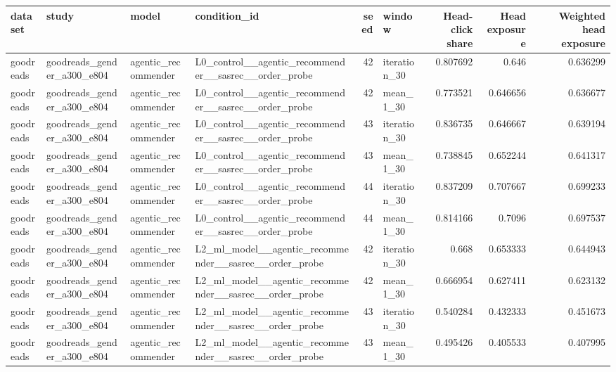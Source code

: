 \begin{table}[htbp!]
\centering
\small
\setlength{\tabcolsep}{3pt}
\renewcommand{\arraystretch}{1.1}
\begin{tabular}{llllrlrrr}
\hline
dataset & study & model & condition\_id & seed & window & Head-click share & Head exposure & Weighted head exposure \\
\hline
goodreads & goodreads\_gender\_a300\_e804 & agentic\_recommender & L0\_control\_\_agentic\_recommender\_\_sasrec\_\_order\_probe & 42 & iteration\_30 & 0.807692 & 0.646 & 0.636299 \\
goodreads & goodreads\_gender\_a300\_e804 & agentic\_recommender & L0\_control\_\_agentic\_recommender\_\_sasrec\_\_order\_probe & 42 & mean\_1\_30 & 0.773521 & 0.646656 & 0.636677 \\
goodreads & goodreads\_gender\_a300\_e804 & agentic\_recommender & L0\_control\_\_agentic\_recommender\_\_sasrec\_\_order\_probe & 43 & iteration\_30 & 0.836735 & 0.646667 & 0.639194 \\
goodreads & goodreads\_gender\_a300\_e804 & agentic\_recommender & L0\_control\_\_agentic\_recommender\_\_sasrec\_\_order\_probe & 43 & mean\_1\_30 & 0.738845 & 0.652244 & 0.641317 \\
goodreads & goodreads\_gender\_a300\_e804 & agentic\_recommender & L0\_control\_\_agentic\_recommender\_\_sasrec\_\_order\_probe & 44 & iteration\_30 & 0.837209 & 0.707667 & 0.699233 \\
goodreads & goodreads\_gender\_a300\_e804 & agentic\_recommender & L0\_control\_\_agentic\_recommender\_\_sasrec\_\_order\_probe & 44 & mean\_1\_30 & 0.814166 & 0.7096 & 0.697537 \\
goodreads & goodreads\_gender\_a300\_e804 & agentic\_recommender & L2\_ml\_model\_\_agentic\_recommender\_\_sasrec\_\_order\_probe & 42 & iteration\_30 & 0.668 & 0.653333 & 0.644943 \\
goodreads & goodreads\_gender\_a300\_e804 & agentic\_recommender & L2\_ml\_model\_\_agentic\_recommender\_\_sasrec\_\_order\_probe & 42 & mean\_1\_30 & 0.666954 & 0.627411 & 0.623132 \\
goodreads & goodreads\_gender\_a300\_e804 & agentic\_recommender & L2\_ml\_model\_\_agentic\_recommender\_\_sasrec\_\_order\_probe & 43 & iteration\_30 & 0.540284 & 0.432333 & 0.451673 \\
goodreads & goodreads\_gender\_a300\_e804 & agentic\_recommender & L2\_ml\_model\_\_agentic\_recommender\_\_sasrec\_\_order\_probe & 43 & mean\_1\_30 & 0.495426 & 0.405533 & 0.407995 \\

\end{tabular}
\end{table}
